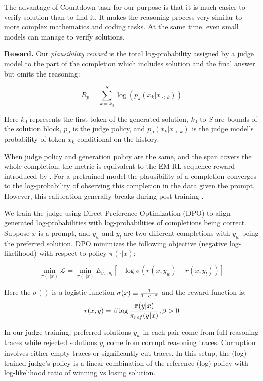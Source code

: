 \documentclass[12pt,a4paper]{article}
\begin{document}
The advantage of Countdown task for our purpose is that it is much easier to verify solution than to find it. It makes the reasoning process very similar to more complex mathematics and coding tasks. At the same time, even small models can manage to verify solutions.


\textbf{Reward.} Our \textit{plausibility reward} is the total log-probability assigned by a judge model to the part of the completion which includes solution and the final answer but omits the reasoning:

\begin{equation}
R_p=\sum_{k=k_0}^S \log(p_J(x_k|x_{<k}))
\end{equation}

Here $k_0$ represents the first token of the generated solution, $k_0$ to $S$ are bounds of the solution block, $p_J$ is the judge policy, and $p_J(x_k|x_{<k})$ is the judge model's probability of token $x_k$ conditional on the history.

When judge policy and generation policy are the same, and the span covers the whole completion, the metric is equivalent to the EM-RL sequence reward introduced by \citet{agarwal_unreasonable_2025}. For a pretrained model the plausibility of a completion converges to the log-probability of observing this completion in the data given the prompt. However, this calibration generally breaks during post-training \citep{openai_gpt-4_2024}.

We train the judge using  Direct Preference Optimization  (DPO) \citep{rafailov_direct_2024} to align generated log-probabilities with log-probabilities of completions being correct. Suppose $x$ is a prompt, and $y_w$ and $y_l$ are two different completions with $y_w$ being the preferred solution. DPO minimizes the following objective (negative log-likelihood) with respect to policy $\pi(\cdot | x)$: 

\begin{equation}
\min_{\pi(\cdot |x)} \mathcal{L}=\min_{\pi(\cdot |x)} E_{y_w,y_l}[-\log \sigma(r(x,y_w)-r(x,y_l))]
\end{equation}

Here the $\sigma()$ is a logistic function $\sigma(x) \equiv {1\over 1+e^{-x}}$ and the reward function is:
\begin{equation}
r(x,y)=\beta \log {\pi(y|x)\over \pi_{ref}(y|x)}, \beta>0
\end{equation}

In our judge training, preferred solutions $y_w$ in each pair come from full reasoning traces while rejected solutions $y_l$ come from corrupt reasoning traces. Corruption involves either empty traces or significantly cut traces. In this setup, the (log) trained judge's policy is a linear combination of the reference (log) policy with log-likelihood ratio of winning vs losing solution.
\end{document}
